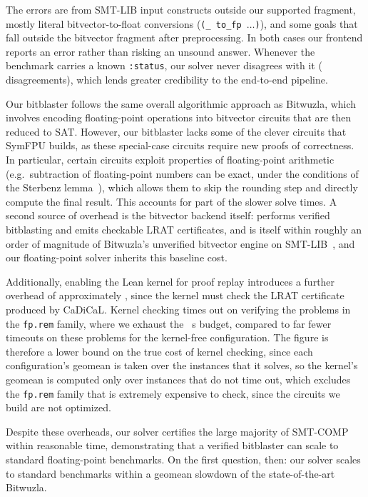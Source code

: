 The errors are from SMT-LIB input constructs outside our supported fragment,
mostly literal bitvector-to-float conversions (\texttt{(\_~to\_fp~$\dots$)}),
and some goals that fall outside the bitvector fragment after preprocessing.
In both cases our frontend reports an error rather than risking an unsound answer.
Whenever the benchmark carries a known \texttt{:status}, our solver never disagrees with it
(\SmtLibNumDisagreementsOurs{} disagreements), which lends greater credibility to the end-to-end pipeline.

Our bitblaster follows the same overall algorithmic approach as Bitwuzla,
which involves encoding floating-point operations into bitvector circuits that are then reduced to SAT.
However, our bitblaster lacks some of the clever circuits that SymFPU builds, as these special-case circuits require new proofs of correctness.
In particular, certain circuits exploit properties of floating-point arithmetic
(e.g.~subtraction of floating-point numbers can be exact, under the conditions of the Sterbenz lemma~\cite{sterbenz1974floating}),
which allows them to skip the rounding step and directly compute the final result.
This accounts for part of the slower solve times.
A second source of overhead is the bitvector backend itself:
\bvdecide{} performs verified bitblasting and emits checkable LRAT
certificates, and is itself within roughly an order of magnitude of
Bitwuzla's unverified bitvector engine on SMT-LIB~\cite{leanbv}, and our floating-point solver inherits this baseline cost.

Additionally, enabling the Lean kernel for proof replay introduces
a further overhead of approximately \KernelOverheadRatio{},
since the kernel must check the LRAT certificate produced by CaDiCaL.
Kernel checking times out on verifying the problems in the \texttt{fp.rem} family,
where we exhaust the \FpConfigTimeoutSec{}~s budget, compared to far fewer timeouts on these problems for the kernel-free configuration.
The \KernelOverheadRatio{} figure is therefore a lower bound on the true cost of kernel checking,
since each configuration's geomean is taken over the instances that it solves, so the kernel's geomean is computed only over instances that do not time out,
which excludes the \texttt{fp.rem} family that is extremely expensive to check,
since the circuits we build are not optimized.

Despite these overheads, our solver certifies the large majority of SMT-COMP
within reasonable time, demonstrating that a verified bitblaster
can scale to standard floating-point benchmarks.
On the first question, then: our solver scales to standard benchmarks within a
\SmtLibGeomeanTimeElapsedRatioOB{} geomean slowdown of the state-of-the-art Bitwuzla.

